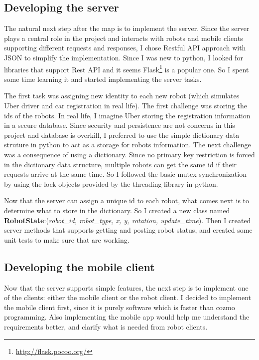 \documentclass[12pt,a4paper]{article}
\begin{document}
\subsection{Developing the server}
The natural next step after the map is to implement the server. Since the server plays a central role in the project and interacts with robots and mobile clients supporting different requests and responses, I chose Restful API approach with JSON to simplify the implementation. Since I was new to python, I looked for libraries that support Rest API and it seems Flask\footnote{\url{http://flask.pocoo.org/}} is a popular one. So I spent some time learning it and started implementing the server tasks. 

The first task was assigning new identity to each new robot (which simulates Uber driver and car registration in real life). The first challenge was storing the ids of the robots. In real life, I imagine Uber storing the registration information in a secure database. Since security and persistence  are not concerns in this project and database is overkill, I preferred to use the simple dictionary data struture in python to act as a storage for robots information. The next challenge was a consequence of using a dictionary. Since no primary key restriction is forced in the dictionary data structure, multiple robots can get the same id if their requests arrive at the same time. So I followed the basic mutex synchronization by using the lock objects provided by the threading library in python. 


Now that the server can assign a unique id to each robot, what comes next is to determine what to store in the dictionary. So I created a new class named \textbf{RobotState}:(\textit{robot\_id, robot\_type, x, y, rotation, update\_time}). Then I created server methods that supports getting and posting robot status, and created some unit tests to make sure that are working. 

\subsection{Developing the mobile client}

Now that the server supports simple features, the next step is to implement one of the clients: either the mobile client or the robot client. I decided to implement the mobile client first, since it is purely software which is faster than cozmo programming. Also implementing the mobile app would help me understand the requirements better, and clarify what is needed from robot clients. 
\end{document}
